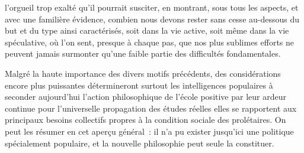 \documentclass[french,twoside]{book} %
\begin{document}
l’orgueil trop exalté qu’il pourrait susciter, en montrant, sous tous les aspects, et avec une familière évidence, combien nous devons rester sans cesse au-dessous du but et du type ainsi caractérisés, soit dans la vie active, soit même dans la vie spéculative, où l’on sent, presque à chaque pas, que nos plus sublimes efforts ne peuvent jamais surmonter qu’une faible partie des difficultés fondamentales.\par
Malgré la haute importance des divers motifs précédents, des considérations encore plus puissantes détermineront surtout les intelligences populaires à seconder aujourd’hui l’action philosophique de l’école positive par leur ardeur continue pour l’universelle propagation des études réelles elles se rapportent aux principaux besoins collectifs propres à la condition sociale des prolétaires. On peut les résumer en cet aperçu général : il n’a pu exister jusqu’ici une politique spécialement populaire, et la nouvelle philosophie peut seule la constituer.\par
\end{document}
